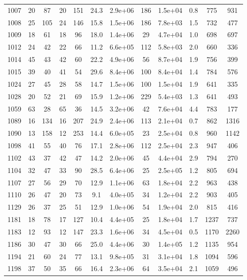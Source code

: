 \begin{table}
\begin{tabular}{cccccccccccc}
1007 & 20 & 87 & 20 & 151 & 24.3 & 2.9e+06 & 186 & 1.5e+04 & 0.8 & 775 & 931 \\
1008 & 25 & 105 & 24 & 146 & 15.8 & 1.5e+06 & 186 & 7.8e+03 & 1.5 & 732 & 477 \\
1009 & 18 & 61 & 18 & 96 & 18.0 & 1.4e+06 & 29 & 4.7e+04 & 1.0 & 698 & 697 \\
1012 & 24 & 42 & 22 & 66 & 11.2 & 6.6e+05 & 112 & 5.8e+03 & 2.0 & 660 & 336 \\
1014 & 45 & 43 & 42 & 60 & 22.2 & 4.9e+06 & 56 & 8.7e+04 & 1.9 & 756 & 399 \\
1015 & 39 & 40 & 41 & 54 & 29.6 & 8.4e+06 & 100 & 8.4e+04 & 1.4 & 784 & 576 \\
1024 & 27 & 45 & 28 & 58 & 14.7 & 1.5e+06 & 100 & 1.5e+04 & 1.9 & 641 & 335 \\
1028 & 20 & 52 & 21 & 69 & 15.9 & 1.2e+06 & 229 & 5.4e+03 & 1.3 & 641 & 493 \\
1059 & 63 & 28 & 65 & 36 & 14.5 & 3.2e+06 & 42 & 7.6e+04 & 4.4 & 783 & 177 \\
1089 & 16 & 134 & 16 & 207 & 24.9 & 2.4e+06 & 113 & 2.1e+04 & 0.7 & 862 & 1316 \\
1090 & 13 & 158 & 12 & 253 & 14.4 & 6.0e+05 & 23 & 2.5e+04 & 0.8 & 960 & 1142 \\
1098 & 41 & 55 & 40 & 76 & 17.1 & 2.8e+06 & 112 & 2.5e+04 & 2.3 & 947 & 406 \\
1102 & 43 & 37 & 42 & 47 & 14.2 & 2.0e+06 & 45 & 4.4e+04 & 2.9 & 794 & 270 \\
1104 & 32 & 47 & 33 & 90 & 28.5 & 6.4e+06 & 25 & 2.5e+05 & 1.2 & 805 & 694 \\
1107 & 27 & 56 & 29 & 70 & 12.9 & 1.1e+06 & 63 & 1.8e+04 & 2.2 & 963 & 438 \\
1110 & 26 & 47 & 20 & 73 & 9.1 & 4.0e+05 & 34 & 1.2e+04 & 2.2 & 903 & 405 \\
1129 & 26 & 37 & 25 & 51 & 12.9 & 1.0e+06 & 54 & 1.9e+04 & 2.0 & 815 & 416 \\
1181 & 18 & 78 & 17 & 127 & 10.4 & 4.4e+05 & 25 & 1.8e+04 & 1.7 & 1237 & 737 \\
1183 & 12 & 93 & 12 & 147 & 23.3 & 1.6e+06 & 34 & 4.5e+04 & 0.5 & 1170 & 2260 \\
1186 & 30 & 47 & 30 & 66 & 25.0 & 4.4e+06 & 30 & 1.4e+05 & 1.2 & 1135 & 954 \\
1194 & 21 & 60 & 24 & 77 & 13.1 & 9.8e+05 & 31 & 3.1e+04 & 1.8 & 1094 & 596 \\
1198 & 37 & 50 & 35 & 66 & 16.4 & 2.3e+06 & 64 & 3.5e+04 & 2.1 & 1059 & 496 \\

\end{tabular}
\end{table}

